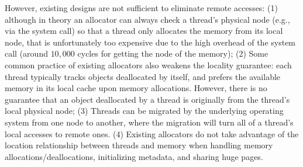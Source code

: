 However, existing designs are not sufficient to eliminate remote accesses: (1) although in theory an allocator can always check a thread's physical node (e.g., via the system call) so that a thread only allocates the memory from its local node, that is unfortunately too expensive due to the high overhead of the system call (around  $10,000$ cycles for getting the node of the memory); (2) Some common practice of existing allocators also weakens the locality guarantee: each thread typically tracks objects deallocated by itself, and prefers the available memory in its local cache upon memory allocations. However, there is no guarantee that an object deallocated by a thread is originally from the thread's local physical node; (3) Threads can be migrated by the underlying operating system from one node to another, where the migration will turn all of a thread's local accesses to remote ones. (4) Existing allocators do not take advantage of the location relationship between threads and memory when handling memory allocations/deallocations, initializing metadata, and sharing huge pages.






